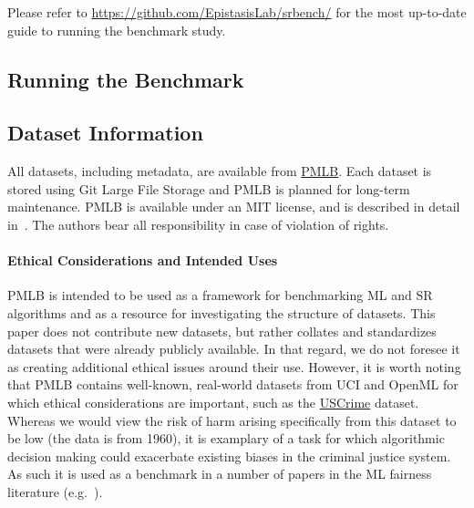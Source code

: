 Please refer to \url{https://github.com/EpistasisLab/srbench/} for the most up-to-date guide to running the benchmark study. 

\subsection{Running the Benchmark}

\subsection{Dataset Information}
All datasets, including metadata, are available from \href{https://epistasislab.github.io/pmlb/}{PMLB}. 
Each dataset is stored using Git Large File Storage and PMLB is planned for long-term maintenance.
PMLB is available under an MIT license, and is described in detail in~\citet{romanoPMLBV1Open2021}. 
The authors bear all responsibility in case of violation of rights.

\paragraph{Ethical Considerations and Intended Uses}
PMLB is intended to be used as a framework for benchmarking ML and SR algorithms and as a resource for investigating the structure of datasets. 
This paper does not contribute new datasets, but rather collates and standardizes datasets that were already publicly available.
In that regard, we do not foresee it as creating additional ethical issues around their use. 
However, it is worth noting that PMLB contains well-known, real-world datasets from UCI and OpenML for which ethical considerations are important, such as the \href{https://github.com/EpistasisLab/pmlb/blob/master/datasets/1089_USCrime/metadata.yaml}{USCrime} dataset. 
Whereas we would view the risk of harm arising specifically from this dataset to be low (the data is from 1960), it is examplary of a task for which algorithmic decision making could exacerbate existing biases in the criminal justice system.  
As such it is used as a benchmark in a number of papers in the ML fairness literature (e.g.~\cite{kearnsPreventingFairnessGerrymandering2018}). 


